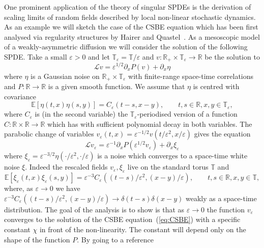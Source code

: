 \documentclass[a4paper, 11pt]{article}
\newcommand{\LL}{\mathcal{L}}
\begin{document}
One prominent application of the theory of singular SPDEs is the derivation of
scaling limits of random fields described by local non-linear stochastic
dynamics. As an example we will sketch the case of the CSBE equation which has
been first analysed via regularity structures by Hairer and
Quastel~{\cite{hairer_class_2015}}. As a mesoscopic model of a
weakly-asymmetric diffusion we will consider the solution of the following
SPDE. Take a small $\varepsilon > 0$ and let $\mathbb{T}_{\varepsilon}
=\mathbb{T}/ \varepsilon$ and $v\colon \mathbb{R}_+ \times
\mathbb{T}_{\varepsilon} \rightarrow \mathbb{R}$ be the solution to
\[ \LL v = \varepsilon^{1 / 2} \partial_x P (v) + \partial_x \eta \]
where $\eta$ is a Gaussian noise on $\mathbb{R}_+ \times
\mathbb{T}_{\varepsilon}$ with finite-range space-time correlations and $P\colon
\mathbb{R} \rightarrow \mathbb{R}$ is a given smooth function. We assume that
$\eta$ is centred with covariance
\[ \mathbb{E} [\eta (t, x) \eta (s, y)] = C_{\varepsilon} (t - s, x - y),
   \qquad t, s \in \mathbb{R}, x, y \in \mathbb{T}_{\varepsilon}, \]
where $C_{\varepsilon}$ is (in the second variable) the $\mathbb{T}_{\varepsilon}$-periodised version of
a function $C \colon \mathbb R \times \mathbb R \to \mathbb R$ which has with sufficient polynomial decay in both
variables. The parabolic change of variables $v_{\varepsilon} (t, x) =
\varepsilon^{- 1 / 2} v (t / \varepsilon^2, x / \varepsilon)$ gives the
equation
\[ \LL v_{\varepsilon} = \varepsilon^{- 1} \partial_x P (\varepsilon^{1 / 2}
   v_{\varepsilon}) + \partial_x \xi_{\varepsilon} \]
where $\xi_{\varepsilon} = \varepsilon^{- 3 / 2} \eta (\cdot / \varepsilon^2,
\cdot / \varepsilon)$ is a noise which converges to a space-time white
noise $\xi$. Indeed the rescaled fields $v_{\varepsilon}, \xi_{\varepsilon}$
live on the standard torus $\mathbb{T}$ and
\[ \mathbb{E} [\xi_{\varepsilon} (t, x) \xi_{\varepsilon} (s, y)] =
   \varepsilon^{- 3} C_{\varepsilon} ((t - s) / \varepsilon^2, (x - y) /
   \varepsilon), \qquad t, s \in \mathbb{R}, x, y \in \mathbb{T},
\]
where, as $\varepsilon \rightarrow 0$ we have $\varepsilon^{- 3}
C_{\varepsilon} ((t - s) / \varepsilon^2, (x - y) / \varepsilon) \rightarrow
\delta (t - s) \delta (x - y)$ weakly as a space-time distribution. The goal
of the analysis is to show is that as $\varepsilon \rightarrow 0$ the function
$v_{\varepsilon}$ converges to the solution of the CSBE equation~(\ref{eq:CSBE})
with a specific constant $\chi$ in front of the non-linearity. The constant
will depend only on the shape of the function $P$. By going to a reference
\end{document}
